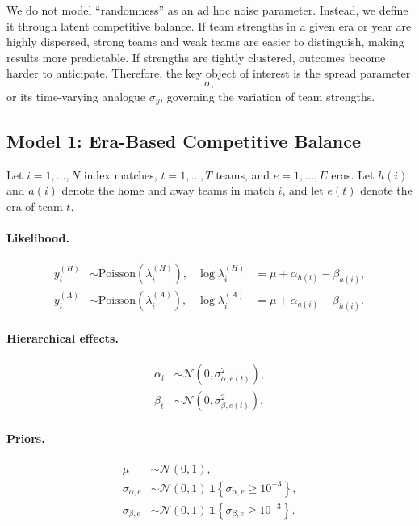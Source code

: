 \documentclass[11pt]{article}
\begin{document}
We do not model ``randomness'' as an ad hoc noise parameter.
Instead, we define it through latent competitive balance.
If team strengths in a given era or year are highly dispersed, strong teams and weak teams are easier to distinguish, making results more predictable.
If strengths are tightly clustered, outcomes become harder to anticipate.
Therefore, the key object of interest is the spread parameter
\[
\sigma,
\]
or its time-varying analogue \(\sigma_y\), governing the variation of team strengths.

\subsection{Model 1: Era-Based Competitive Balance}

Let \(i=1,\dots,N\) index matches, \(t=1,\dots,T\) teams, and \(e=1,\dots,E\) eras. Let \(h(i)\) and \(a(i)\) denote the home and away teams in match \(i\), and let \(e(t)\) denote the era of team \(t\).

\paragraph{Likelihood.}
\begin{align}
y_i^{(H)} &\sim \mathrm{Poisson}\!\left(\lambda_i^{(H)}\right), &
\log \lambda_i^{(H)} &= \mu + \alpha_{h(i)} - \beta_{a(i)}, \\
y_i^{(A)} &\sim \mathrm{Poisson}\!\left(\lambda_i^{(A)}\right), &
\log \lambda_i^{(A)} &= \mu + \alpha_{a(i)} - \beta_{h(i)}.
\end{align}

\paragraph{Hierarchical effects.}
\begin{align}
\alpha_t &\sim \mathcal{N}\!\left(0,\sigma_{\alpha,e(t)}^2\right), \\
\beta_t  &\sim \mathcal{N}\!\left(0,\sigma_{\beta,e(t)}^2\right).
\end{align}

\paragraph{Priors.}
\begin{align}
\mu &\sim \mathcal{N}(0,1), \\
\sigma_{\alpha,e} &\sim \mathcal{N}(0,1)\,\mathbf{1}\!\left\{\sigma_{\alpha,e}\ge 10^{-3}\right\}, \\
\sigma_{\beta,e}  &\sim \mathcal{N}(0,1)\,\mathbf{1}\!\left\{\sigma_{\beta,e}\ge 10^{-3}\right\}.
\end{align}
\end{document}
